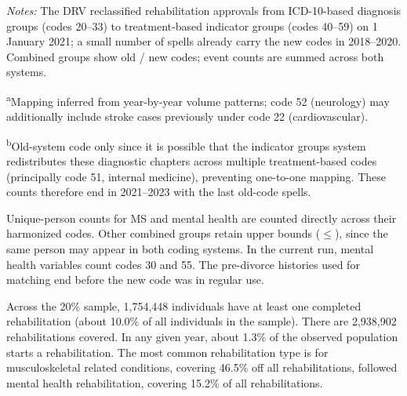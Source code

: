 \documentclass[a4paper,12pt]{article}
\theoremstyle{plain}
\theoremstyle{definition}
\theoremstyle{TheoremNum}
\theoremstyle{CorollaryNum}
\theoremstyle{PropositionNum}
\theoremstyle{TheoremNum}
\begin{document}
\begin{table}[H]
\begin{minipage}{\textwidth}
\footnotesize
\textit{Notes:} The DRV reclassified rehabilitation approvals from ICD-10-based diagnosis groups (codes 20--33) to treatment-based indicator groups (codes 40--59) on 1 January 2021; a small number of spells already carry the new codes in 2018--2020. Combined groups show old / new codes; event counts are summed across both systems.

\textsuperscript{a}Mapping inferred from year-by-year volume patterns;
code 52 (neurology) may additionally include stroke cases previously under code 22 (cardiovascular).

\textsuperscript{b}Old-system code only since it is possible that the indicator groups system redistributes these diagnostic chapters across multiple treatment-based codes (principally code 51, internal medicine), preventing one-to-one mapping. These counts therefore end in 2021--2023 with the last old-code spells. 

Unique-person counts for MS and mental health are counted directly across their harmonized codes. Other combined groups retain upper bounds ($\leq$), since the same person may appear in both coding systems. In the current run, mental health variables count codes 30 and 55. The pre-divorce histories used for matching end before the new code was in regular use.
\end{minipage}
\end{table}

Across the 20\% sample, 1,754,448 individuals have at least one completed rehabilitation (about 10.0\% of all individuals in the sample). There are 2,938,902 rehabilitations covered. In any given year, about 1.3\% of the observed population starts a rehabilitation. The most common rehabilitation type is for musculoskeletal related conditions, covering 46.5\% off all rehabilitations, followed mental health rehabilitation, covering 15.2\% of all rehabilitations.
\end{document}
